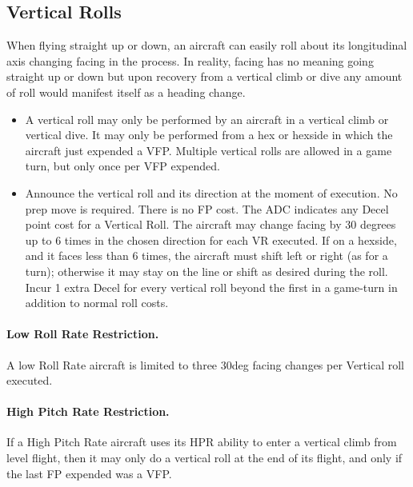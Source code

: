 
\subsection{Vertical Rolls}
\label{rule:vertical-rolls}

When flying straight up or down, an aircraft can easily roll about its longitudinal axis changing facing in the process. In reality, facing has no meaning going straight up or down but upon recovery from a vertical climb or dive any amount of roll would manifest itself as a heading change.

\begin{itemize}

    \item{} A vertical roll may only be performed by an aircraft in a vertical climb or vertical dive. It may only be performed from a hex or hexside in which the aircraft just expended a VFP. Multiple vertical rolls are allowed in a game turn, but only once per VFP expended.

    \item{} Announce the vertical roll and its direction at the moment of execution. No prep move is required. There is no FP cost. The ADC indicates any Decel point cost for a Vertical Roll. The aircraft may change facing  by 30 degrees up to 6 times in the chosen direction for each VR executed. If on a hexside, and it faces less than 6 times, the aircraft must shift left or right (as for a turn); otherwise it may stay on the line or shift as desired during the roll.  Incur 1 extra Decel for every vertical roll beyond the first in a game-turn in addition to normal roll costs.

\end{itemize}

\paragraph{Low Roll Rate Restriction.} A low Roll Rate aircraft is limited to three 30{deg} facing changes per Vertical roll executed.

\paragraph{High Pitch Rate Restriction.} If a High Pitch Rate aircraft uses its HPR ability to enter a vertical climb from level flight, then it may only do a vertical roll at the end of its flight, and only if the last FP expended was a VFP.

